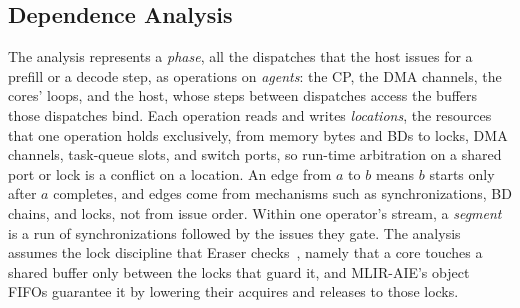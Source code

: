 \subsection{Dependence Analysis}
\label{sec:order}

The analysis represents a \emph{phase}, all the dispatches that the host issues for a prefill or a decode step, as operations on \emph{agents}: the CP, the DMA channels, the cores' loops, and the host, whose steps between dispatches access the buffers those dispatches bind.
Each operation reads and writes \emph{locations}, the resources that one operation holds exclusively, from memory bytes and BDs to locks, DMA channels, task-queue slots, and switch ports, so run-time arbitration on a shared port or lock is a conflict on a location.
An edge from $a$ to $b$ means $b$ starts only after $a$ completes, and edges come from mechanisms such as synchronizations, BD chains, and locks, not from issue order.
Within one operator's stream, a \emph{segment} is a run of synchronizations followed by the issues they gate.
The analysis assumes the lock discipline that Eraser checks~\citep{savage1997eraser}, namely that a core touches a shared buffer only between the locks that guard it, and MLIR-AIE's object FIFOs guarantee it by lowering their acquires and releases to those locks.

